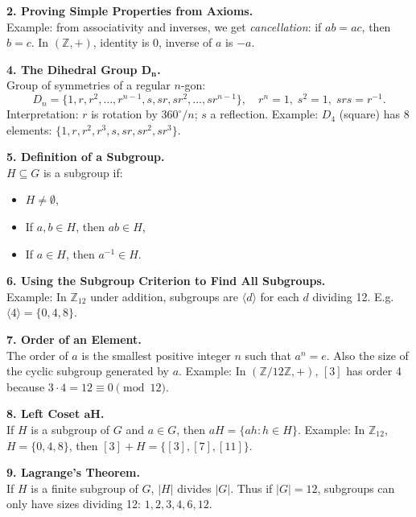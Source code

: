 \documentclass[10pt]{article}
\begin{document}
\textbf{2. Proving Simple Properties from Axioms.}\\
Example: from associativity and inverses, we get \emph{cancellation}: if \(ab=ac\), then \(b=c\). In \((\mathbb{Z},+)\), identity is \(0\), inverse of \(a\) is \(-a\).

\textbf{4. The Dihedral Group \(\mathbf{D_n}\).}\\
Group of symmetries of a regular \(n\)-gon:
\[
D_n = \{1, r, r^2,\dots,r^{n-1}, s, sr, sr^2,\dots,sr^{n-1}\},
\quad r^n=1,\; s^2=1,\; srs=r^{-1}.
\]
Interpretation: \(r\) is rotation by \(360^\circ/n\); \(s\) a reflection. Example: \(D_4\) (square) has 8 elements: \(\{1,r,r^2,r^3,s,sr,sr^2,sr^3\}\).

\textbf{5. Definition of a Subgroup.}\\
\(H \subseteq G\) is a subgroup if:
\begin{itemize}
\item \(H\neq \emptyset\),
\item If \(a,b \in H\), then \(ab \in H\),
\item If \(a\in H\), then \(a^{-1}\in H\).
\end{itemize}

\textbf{6. Using the Subgroup Criterion to Find All Subgroups.}\\
Example: In \(\mathbb{Z}_{12}\) under addition, subgroups are \(\langle d\rangle\) for each \(d\) dividing 12. E.g. \(\langle4\rangle=\{0,4,8\}\).

\textbf{7. Order of an Element.}\\
The order of \(a\) is the smallest positive integer \(n\) such that \(a^n=e\). Also the size of the cyclic subgroup generated by \(a\). Example: In \((\mathbb{Z}/12\mathbb{Z},+)\), \([3]\) has order 4 because \(3 \cdot 4=12\equiv0\pmod{12}\).

\textbf{8. Left Coset \(\mathbf{aH}\).}\\
If \(H\) is a subgroup of \(G\) and \(a\in G\), then \(aH=\{ah : h\in H\}\). Example: In \(\mathbb{Z}_{12}\), \(H=\{0,4,8\}\), then \([3]+H=\{[3],[7],[11]\}\).

\textbf{9. Lagrange’s Theorem.}\\
If \(H\) is a finite subgroup of \(G\), \(|H|\) divides \(|G|\). Thus if \(|G|=12\), subgroups can only have sizes dividing 12: \(1,2,3,4,6,12\).
\end{document}
